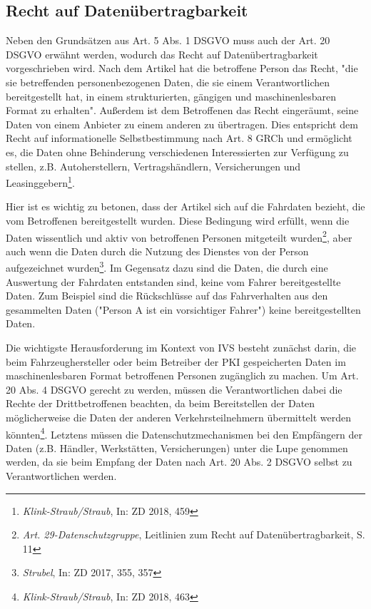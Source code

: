 \subsection{Recht auf Datenübertragbarkeit}

Neben den Grundsätzen aus Art. 5 Abs. 1 DSGVO muss auch der Art. 20 DSGVO erwähnt werden, wodurch das Recht auf Datenübertragbarkeit vorgeschrieben wird. Nach dem Artikel hat die betroffene Person das Recht, "die sie betreffenden personenbezogenen Daten, die sie einem Verantwortlichen bereitgestellt hat, in einem strukturierten, gängigen und maschinenlesbaren Format zu erhalten". Außerdem ist dem Betroffenen das Recht eingeräumt, seine Daten von einem Anbieter zu einem anderen zu übertragen. Dies entspricht dem Recht auf informationelle Selbstbestimmung nach Art. 8 GRCh und ermöglicht es, die Daten ohne Behinderung verschiedenen Interessierten zur Verfügung zu stellen, z.B. Autoherstellern, Vertragshändlern, Versicherungen und Leasinggebern\footnote{\emph{Klink-Straub/Straub}, In: ZD 2018, 459}.

Hier ist es wichtig zu betonen, dass der Artikel sich auf die Fahrdaten bezieht, die vom Betroffenen bereitgestellt wurden. Diese Bedingung wird erfüllt, wenn die Daten wissentlich und aktiv von betroffenen Personen mitgeteilt wurden\footnote{\emph{Art. 29-Datenschutzgruppe}, Leitlinien zum Recht auf Datenübertragbarkeit, S. 11}, aber auch wenn die Daten durch die Nutzung des Dienstes von der Person aufgezeichnet wurden\footnote{\emph{Strubel}, In: ZD 2017, 355, 357}. Im Gegensatz dazu sind die Daten, die durch eine Auswertung der Fahrdaten entstanden sind, keine vom Fahrer bereitgestellte Daten. Zum Beispiel sind die Rückschlüsse auf das Fahrverhalten aus den gesammelten Daten ("Person A ist ein vorsichtiger Fahrer") keine bereitgestellten Daten. 

Die wichtigste Herausforderung im Kontext von IVS besteht zunächst darin, die beim Fahrzeughersteller oder beim Betreiber der PKI gespeicherten Daten im maschinenlesbaren Format betroffenen Personen zugänglich zu machen. Um Art. 20 Abs. 4 DSGVO gerecht zu werden, müssen die Verantwortlichen dabei die Rechte der Drittbetroffenen beachten, da beim Bereitstellen der Daten möglicherweise die Daten der anderen Verkehrsteilnehmern übermittelt werden könnten\footnote{\emph{Klink-Straub/Straub}, In: ZD 2018, 463}. Letztens müssen die Datenschutzmechanismen bei den Empfängern der Daten (z.B. Händler, Werkstätten, Versicherungen) unter die Lupe genommen werden, da sie beim Empfang der Daten nach Art. 20 Abs. 2 DSGVO selbst zu Verantwortlichen werden.




